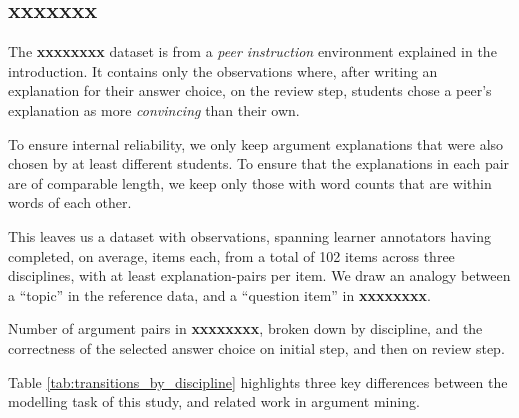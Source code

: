 \documentclass[runningheads]{llncs}
\begin{document}
\subsection{xxxxxxx}
The \textbf{xxxxxxxx} dataset is from a \textit{peer instruction} environment 
explained in the introduction.
It contains only the observations where, after writing an explanation for their 
answer choice, on the review step, students chose a peer's explanation as more 
\textit{convincing} than their own.  

To ensure internal reliability, we only keep argument explanations that were 
also chosen by at least different 
students. 
To ensure that the explanations in each pair are of comparable length, we keep 
only those with word counts that are within 
words of each other. 

This leaves us a dataset with observations, 
spanning  learner annotators having 
completed, on average, 
 items each, from a total of 
%
102 items across three disciplines, 
with at least 
explanation-pairs 
per item.
We draw an analogy between a ``topic'' in the reference data, and a 
``question item'' in \textbf{xxxxxxxx}.


\begin{table}
	\caption{Number of argument pairs in \textbf{xxxxxxxx}, broken down by 
	discipline, and the 
	correctness of the selected answer choice on initial step, and then on 
	review step.}
	
	\centerline{}
	
	\label{tab:transitions_by_discipline}
\end{table}

Table \ref{tab:transitions_by_discipline} highlights three key differences 
between the modelling task of this study, and related work in argument mining. 
\end{document}
